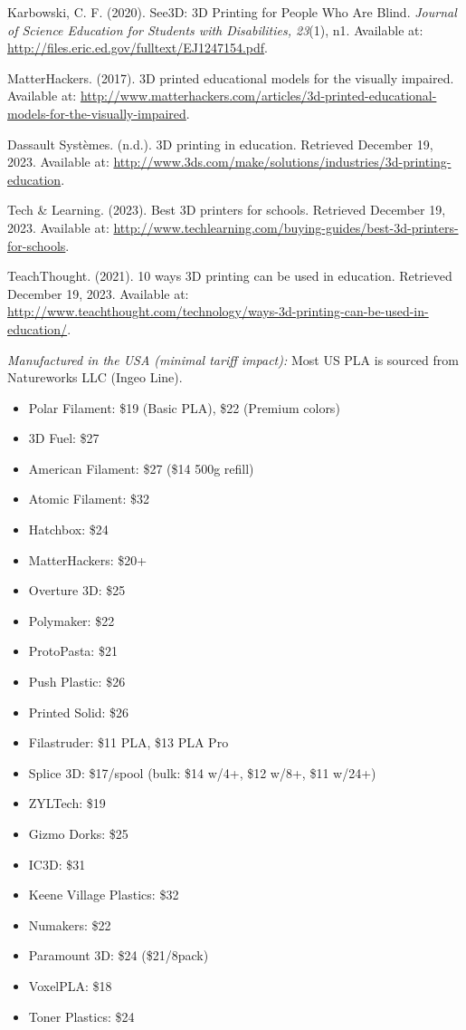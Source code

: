 \begin{thebibliography}{99}

 Karbowski, C. F. (2020). See3D: 3D Printing for People Who Are Blind. \textit{Journal of Science Education for Students with Disabilities, 23}(1), n1. Available at: \url{http://files.eric.ed.gov/fulltext/EJ1247154.pdf}.

 MatterHackers. (2017). 3D printed educational models for the visually impaired. Available at: \url{http://www.matterhackers.com/articles/3d-printed-educational-models-for-the-visually-impaired}.

 Dassault Systèmes. (n.d.). 3D printing in education. Retrieved December 19, 2023. Available at: \url{http://www.3ds.com/make/solutions/industries/3d-printing-education}.

 Tech \& Learning. (2023). Best 3D printers for schools. Retrieved December 19, 2023. Available at: \url{http://www.techlearning.com/buying-guides/best-3d-printers-for-schools}.

 TeachThought. (2021). 10 ways 3D printing can be used in education. Retrieved December 19, 2023. Available at: \url{http://www.teachthought.com/technology/ways-3d-printing-can-be-used-in-education/}.

\end{thebibliography}

\emph{Manufactured in the USA (minimal tariff impact):}
Most US PLA is sourced from Natureworks LLC (Ingeo Line).
\begin{itemize}
    \item Polar Filament: \$19 (Basic PLA), \$22 (Premium colors)
    \item 3D Fuel: \$27
    \item American Filament: \$27 (\$14 500g refill)
    \item Atomic Filament: \$32
    \item Hatchbox: \$24
    \item MatterHackers: \$20+
    \item Overture 3D: \$25
    \item Polymaker: \$22
    \item ProtoPasta: \$21
    \item Push Plastic: \$26
    \item Printed Solid: \$26
    \item Filastruder: \$11 PLA, \$13 PLA Pro
    \item Splice 3D: \$17/spool (bulk: \$14 w/4+, \$12 w/8+, \$11 w/24+)
    \item ZYLTech: \$19
    \item Gizmo Dorks: \$25
    \item IC3D: \$31
    \item Keene Village Plastics: \$32
    \item Numakers: \$22
    \item Paramount 3D: \$24 (\$21/8pack)
    \item VoxelPLA: \$18
    \item Toner Plastics: \$24
\end{itemize}

